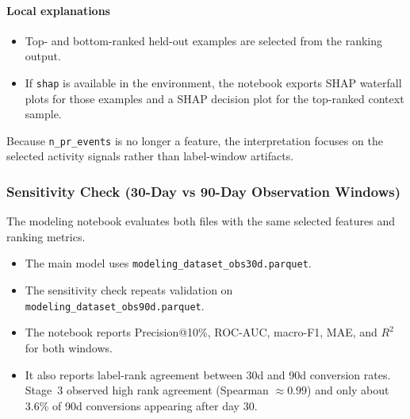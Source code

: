 \paragraph{Local explanations}
\begin{itemize}
    \item Top- and bottom-ranked held-out examples are selected from the ranking output.
    \item If \texttt{shap} is available in the environment, the notebook exports SHAP waterfall plots for those examples and a SHAP decision plot for the top-ranked context sample.
\end{itemize}

Because \texttt{n\_pr\_events} is no longer a feature, the interpretation focuses on the selected activity signals rather than label-window artifacts.

\subsubsection{Sensitivity Check (30-Day vs 90-Day Observation Windows)}

The modeling notebook evaluates both files with the same selected features and ranking metrics.

\begin{itemize}
    \item The main model uses \texttt{modeling\_dataset\_obs30d.parquet}.
    \item The sensitivity check repeats validation on \texttt{modeling\_dataset\_obs90d.parquet}.
    \item The notebook reports Precision@10\%, ROC-AUC, macro-F1, MAE, and $R^2$ for both windows.
    \item It also reports label-rank agreement between 30d and 90d conversion rates. Stage~3 observed high rank agreement (Spearman $\approx 0.99$) and only about $3.6\%$ of 90d conversions appearing after day 30.
\end{itemize}

\begin{table}[H]
\centering
{}
\caption{Sensitivity of best model metrics across 30-day and 90-day label windows}
\label{tab:modeling_window_sensitivity}
\end{table}


